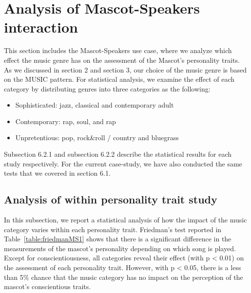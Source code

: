 \section{Analysis of Mascot-Speakers interaction}
\label{M-S}
This section includes the Mascot-Speakers use case, where we analyze which effect the music genre has on the assessment
of the Mascot’s personality traits. As we discussed in section 2 and section 3, our choice of the music genre is based
on the MUSIC pattern. For statistical analysis, we examine the effect of each category by distributing genres into
three categories as the following:
\begin{itemize}
  \item Sophisticated:  jazz, classical and contemporary adult
  \item Contemporary: rap, soul, and rap
  \item Unpretentious: pop, rock\&roll / country and bluegrass
\end{itemize}

Subsection 6.2.1 and subsection 6.2.2 describe the statistical results for each study respectively. For the current
case-study, we have also conducted the same tests that we covered in section 6.1.

\subsection{Analysis of within personality trait study}
\label{Study1(M-S)}
In this subsection, we report a statistical analysis of how the impact of the music category varies within each
personality trait. Friedman’s test reported in Table~\ref{table:friedmanMS1} shows that there is a significant
difference in the measurements of the mascot’s personality depending on which song is played. Except for conscientiousness,
all categories reveal their effect (with p < 0.01) on the assessment of each personality trait. However, with p < 0.05,
there is a less than 5\% chance that the music category has no impact on the perception of the mascot’s conscientious traits.

